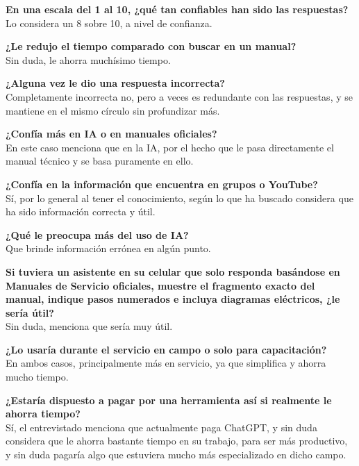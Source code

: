 {{    \textbf{En una escala del 1 al 10, ¿qué tan confiables han sido las respuestas?}\\
    Lo considera un 8 sobre 10, a nivel de confianza.

    \textbf{¿Le redujo el tiempo comparado con buscar en un manual?}\\
    Sin duda, le ahorra muchísimo tiempo.

    \textbf{¿Alguna vez le dio una respuesta incorrecta?}\\
    Completamente incorrecta no, pero a veces es redundante con las respuestas, y se mantiene en el mismo círculo sin profundizar más.

    \textbf{¿Confía más en IA o en manuales oficiales?}\\
    En este caso menciona que en la IA, por el hecho que le pasa directamente el manual técnico y se basa puramente en ello.

    \textbf{¿Confía en la información que encuentra en grupos o YouTube?}\\
    Sí, por lo general al tener el conocimiento, según lo que ha buscado considera que ha sido información correcta y útil.

    \textbf{¿Qué le preocupa más del uso de IA?}\\
    Que brinde información errónea en algún punto.

    \textbf{Si tuviera un asistente en su celular que solo responda basándose en Manuales de Servicio oficiales, muestre el fragmento exacto del manual, indique pasos numerados e incluya diagramas eléctricos, ¿le sería útil?}\\
    Sin duda, menciona que sería muy útil.

    \textbf{¿Lo usaría durante el servicio en campo o solo para capacitación?}\\
    En ambos casos, principalmente más en servicio, ya que simplifica y ahorra mucho tiempo.

    \textbf{¿Estaría dispuesto a pagar por una herramienta así si realmente le ahorra tiempo?}\\
    Sí, el entrevistado menciona que actualmente paga ChatGPT, y sin duda considera que le ahorra bastante tiempo en su trabajo, para ser más productivo, y sin duda pagaría algo que estuviera mucho más especializado en dicho campo.

    \vspace{1cm}


}}
